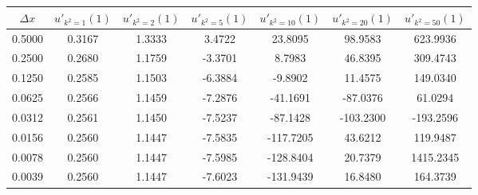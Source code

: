 \begin{tabular}{|c|c|c|c|c|c|c|}
\hline
\textbf{$\Delta x$}&\textbf{$u'_{k^2=1}(1)$}&\textbf{$u'_{k^2=2}(1)$}&\textbf{$u'_{k^2=5}(1)$}&\textbf{$u'_{k^2=10}(1)$}&\textbf{$u'_{k^2=20}(1)$}&\textbf{$u'_{k^2=50}(1)$}\\\hline
0.5000&0.3167&1.3333&3.4722&23.8095&98.9583&623.9936\\\hline
0.2500&0.2680&1.1759&-3.3701&8.7983&46.8395&309.4743\\\hline
0.1250&0.2585&1.1503&-6.3884&-9.8902&11.4575&149.0340\\\hline
0.0625&0.2566&1.1459&-7.2876&-41.1691&-87.0376&61.0294\\\hline
0.0312&0.2561&1.1450&-7.5237&-87.1428&-103.2300&-193.2596\\\hline
0.0156&0.2560&1.1447&-7.5835&-117.7205&43.6212&119.9487\\\hline
0.0078&0.2560&1.1447&-7.5985&-128.8404&20.7379&1415.2345\\\hline
0.0039&0.2560&1.1447&-7.6023&-131.9439&16.8480&164.3739\\\hline
\end{tabular}
